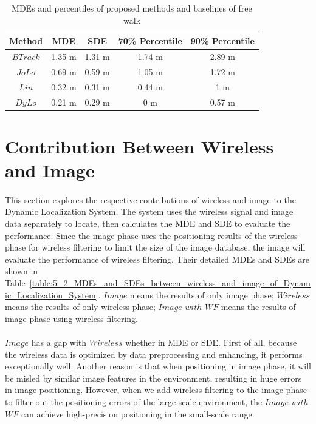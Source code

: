 \documentclass[a4paper,12pt]{report}
\begin{document}
\begin{table}
    \begin{center}
    \caption{MDEs and percentiles of proposed methods and baselines of free walk}
    \label{table:5_1_MDEs_and_Percentiles_FW}
        \begin{tabular}{|c||c|c|c|c|}
            \hline
                Method & MDE & SDE & 70\% Percentile & 90\% Percentile \\
            \hline
            \hline
                $BTrack$ & 1.35 m & 1.31 m & 1.74 m & 2.89 m \\
            \hline
                $JoLo$   & 0.69 m & 0.59 m & 1.05 m & 1.72 m \\
            \hline
                $Lin$    & 0.32 m & 0.31 m & 0.44 m & 1 m \\
            \hline
                $DyLo$   & 0.21 m & 0.29 m & 0 m    & 0.57 m \\
            \hline
        \end{tabular}
    \end{center}
\end{table}


\section{Contribution Between Wireless and Image}
\paragraph{}
This section explores the respective contributions of wireless and image to the Dynamic Localization System. The system uses the wireless signal and image data separately to locate, then calculates the MDE and SDE to evaluate the performance. Since the image phase uses the positioning results of the wireless phase for wireless filtering to limit the size of the image database, the image will evaluate the performance of wireless filtering. Their detailed MDEs and SDEs are shown in Table~\ref{table:5_2_MDEs_and_SDEs_between_wireless_and_image_of_Dynamic_Localization_System}. $Image$ means the results of only image phase; $Wireless$ means the results of only wireless phase; $Image$ $with$ $WF$ means the results of image phase using wireless filtering.

\paragraph{}
$Image$ has a gap with $Wireless$ whether in MDE or SDE. First of all, because the wireless data is optimized by data preprocessing and enhancing, it performs exceptionally well. Another reason is that when positioning in image phase, it will be misled by similar image features in the environment, resulting in huge errors in image positioning. However, when we add wireless filtering to the image phase to filter out the positioning errors of the large-scale environment, the $Image$ $with$ $WF$ can achieve high-precision positioning in the small-scale range.
\end{document}
